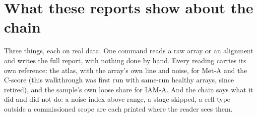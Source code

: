 \section{What these reports show about the chain}

Three things, each on real data. One command reads a raw array or an alignment and writes the full report, with nothing done by hand. Every
reading carries its own reference: the atlas, with the array's own line and noise, for Met-A and the C-score (this walkthrough was first run with same-run healthy arrays, since retired), and the sample's own loose share for IAM-A. And the chain
says what it did and did not do: a noise index above range, a stage skipped, a cell type outside a commissioned scope are each printed where the
reader sees them.
